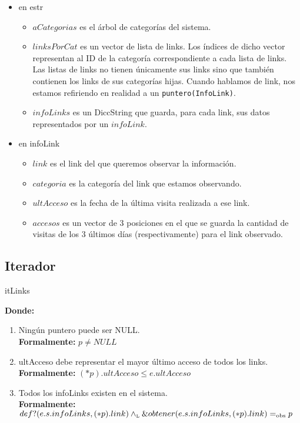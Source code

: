 \documentclass[10pt, a4paper]{article}
\let\TipoVariable=\texttt
\begin{document}
\begin{itemize}
  \item en estr
  \begin{itemize}
	\item $aCategorias$ es el \'arbol de categor\'ias del sistema.
	\item $linksPorCat$ es un vector de lista de links. Los \'indices de dicho vector representan al ID de la categor\'ia correspondiente a cada lista de links. Las listas de links no tienen \'unicamente sus links sino que tambi\'en contienen los links de sus categor\'ias hijas. Cuando hablamos de link, nos estamos refiriendo en realidad a un \TipoVariable{puntero(InfoLink)}. 
	\item $infoLinks$ es un DiccString que guarda, para cada link, sus datos representados por un $infoLink$.
  \end{itemize}
  \item en infoLink
  \begin{itemize}
	\item $link$ es el link del que queremos observar la informaci\'on.
	\item $categoria$ es la categor\'ia del link que estamos observando.
	\item $ultAcceso$ es la fecha de la \'ultima visita realizada a ese link.
	\item $accesos$ es un vector de 3 posiciones en el que se guarda la cantidad de visitas de los 3 \'ultimos d\'ias (respectivamente) para el link observado.
  \end{itemize}
\end{itemize}

\subsection{Iterador}

\begin{Estructura}{itLinks}
	\begin{Tupla}
	\end{Tupla}
\end{Estructura}

\mbox{}

{\bf Donde:}

\begin{enumerate}
  \item Ning\'un puntero puede ser NULL.\\
		{\bf Formalmente:} $p \neq NULL$

  \item ultAcceso debe representar el mayor \'ultimo acceso de todos los links.\\
		{\bf Formalmente:} $(*p).ultAcceso \leq e.ultAcceso$

  \item Todos los infoLinks existen en el sistema.\\
		{\bf Formalmente:} $def?(e.s.infoLinks, (*p).link) \land_{\mathrm{\scriptscriptstyle{L}}} \&obtener(e.s.infoLinks, (*p).link) =_{\mathrm{obs}} p$
\end{enumerate}
\end{document}
